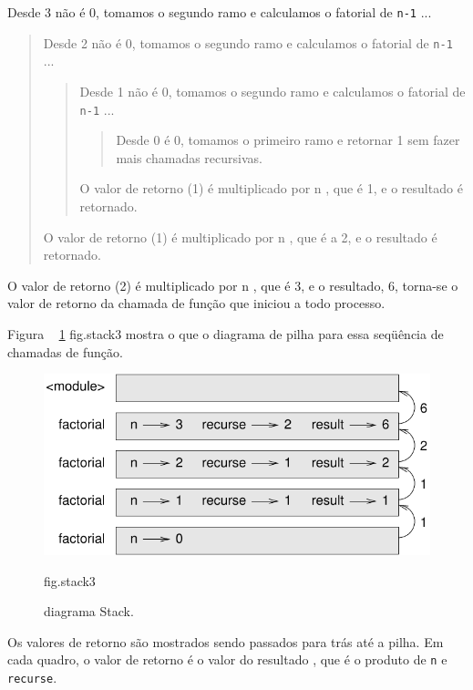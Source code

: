 \documentclass[10pt]{book}
\begin{document}
\begin{exercise}
{{{Desde 3 não é 0, tomamos o segundo ramo e calculamos o fatorial
de {\tt n-1} ...

\begin{quote}
Desde 2 não é 0, tomamos o segundo ramo e calculamos o fatorial de
{\tt n-1} ...


  \begin{quote}
  Desde 1 não é 0, tomamos o segundo ramo e calculamos o fatorial
  de {\tt n-1} ...


    \begin{quote}
    Desde 0 {\em} é 0, tomamos o primeiro ramo e retornar 1
    sem fazer mais chamadas recursivas.
    \end{quote}


  O valor de retorno (1) é multiplicado por n $ $, que é 1, e o
  resultado é retornado.
  \end{quote}


O valor de retorno (1) é multiplicado por n $ $, que é a 2, e o
resultado é retornado.
\end{quote}


O valor de retorno (2) é multiplicado por n $ $, que é 3, e o resultado, 6,
torna-se o valor de retorno da chamada de função que iniciou a todo
processo.

Figura ~ \ref {} fig.stack3 mostra o que o diagrama de pilha para
essa seqüência de chamadas de função.

\begin{figure}
\centerline
{\includegraphics[scale = 0.8] {figs/stack3.pdf}}
\caption{diagrama Stack.}
\label{} fig.stack3
\end{figure}

Os valores de retorno são mostrados sendo passados ​​para trás até a pilha. Em cada
quadro, o valor de retorno é o valor do resultado {\tt}, que é o
produto de {\tt n} e {\tt recurse}.

}}}
\end{exercise}
\end{document}
